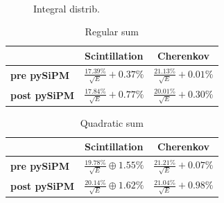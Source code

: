 \begin{figure}
	\centering
	 \\
	\caption{Integral distrib.}
	\label{fig:sigma_su_e}
\end{figure}

\begin{table}
	\centering
	\begin{tabular}{lcc}
		\toprule
		& \textbf{Scintillation} & \textbf{Cherenkov} \\
		\midrule
		\textbf{pre pySiPM} &	$\frac{17.39\%}{\sqrt{E}}+0.37\%$ 	& $\frac{21.13\%}{\sqrt{E}}+0.01\%$ \\
		\textbf{post pySiPM} & $\frac{17.84\%}{\sqrt{E}}+0.77\%$ 	& $\frac{20.01\%}{\sqrt{E}}+0.30\%$ \\
		\bottomrule
	\end{tabular}
	\caption{Regular sum}
	\label{tab:res_regular_sum}
\end{table}

\begin{table}
	\centering
	\begin{tabular}{lcc}
		\toprule
		& \textbf{Scintillation} & \textbf{Cherenkov} \\
		\midrule
		\textbf{pre pySiPM} &	$\frac{19.78\%}{\sqrt{E}}\oplus1.55\%$ 	& $\frac{21.21\%}{\sqrt{E}}+0.07\%$ \\
		\textbf{post pySiPM} & $\frac{20.14\%}{\sqrt{E}}\oplus1.62\%$ 	& $\frac{21.04\%}{\sqrt{E}}+0.98\%$ \\
		\bottomrule
	\end{tabular}
	\caption{Quadratic sum}
	\label{tab:res_quadratic_sum}
\end{table}

